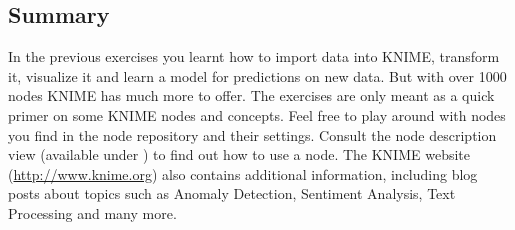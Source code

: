 \subsection{Summary}
In the previous exercises you learnt how to import data into KNIME, transform it, visualize it and learn a model for predictions on new data. But with over 1000 nodes KNIME has much more to offer. The exercises are only meant as a quick primer on some KNIME nodes and concepts. Feel free to play around with nodes you find in the node repository and their settings. Consult the node description view (available under ) to find out how to use a node. The KNIME website (\url{http://www.knime.org}) also contains additional information, including blog posts about topics such as Anomaly Detection, Sentiment Analysis, Text Processing and many more.